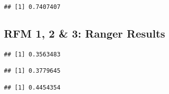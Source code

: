 \documentclass[11pt,preprint, authoryear]{elsarticle}
\numberwithin{equation}{section}
\numberwithin{figure}{section}
\numberwithin{table}{section}
\begin{document}
\begin{verbatim}
## [1] 0.7407407
\end{verbatim}

\hypertarget{rfm-1-2-3-ranger-results}{%
\subsection{RFM 1, 2 \& 3: Ranger
Results}\label{rfm-1-2-3-ranger-results}}

\begin{verbatim}
## [1] 0.3563483
\end{verbatim}

\begin{verbatim}
## [1] 0.3779645
\end{verbatim}

\begin{verbatim}
## [1] 0.4454354
\end{verbatim}


\end{document}
